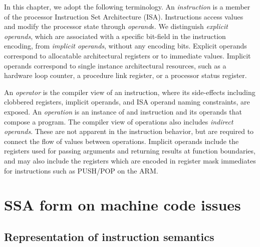 In this chapter, we adopt the following terminology. An \emph{instruction} is a
member of the processor Instruction Set Architecture (ISA). Instructions access
values and modify the processor state through \emph{operand}s. We distinguish
\emph{explicit operands}, which are associated with a specific bit-field in the
instruction encoding, from \emph{implicit operands}, without any encoding bits.
Explicit operands correspond to allocatable architectural registers or to
immediate values. Implicit operands correspond to single instance architectural
resources, such as a hardware loop counter, a procedure link register, or a
processor status register.

An \emph{operator} is the compiler view of an instruction, where its
side-effects including clobbered registers, implicit operands, and ISA operand
naming constraints, are exposed. An \emph{operation} is an instance of and
instruction and its operands that compose a program. The compiler view of
operations also includes \emph{indirect operands}. These are not apparent in the
instruction behavior, but are required to connect the flow of values between
operations. Implicit operands include the registers used for passing arguments
and returning results at function boundaries, and may also include the registers
which are encoded in register mask immediates for instructions such as PUSH/POP
on the ARM.

\section{SSA form on machine code issues}
\label{sec:ssa-codegen-issues}

\subsection{Representation of instruction semantics}

